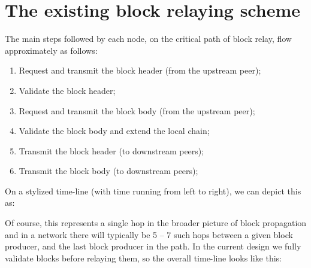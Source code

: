 \documentclass[11pt,a4paper]{article}
\begin{document}
\pagebreak

\section{The existing block relaying scheme}
The main steps followed by each node, on the critical path of block relay, flow approximately
as follows:

\begin{enumerate}
  \item Request and transmit the block header (from the upstream peer);
  \item Validate the block header;
  \item Request and transmit the block body (from the upstream peer);
  \item Validate the block body and extend the local chain;
  \item Transmit the block header (to downstream peers);
  \item Transmit the block body (to downstream peers);
\end{enumerate}

On a stylized time-line (with time running from left to right), we can depict
this as:

\begin{center}
\end{center}

Of course, this represents a single hop in the broader picture of block propagation and in a network there will typically
be 5 -- 7 such hops between a given block producer, and the last block producer in the path. In the current design we 
fully validate blocks before relaying them, so the overall time-line looks like this:
\end{document}
